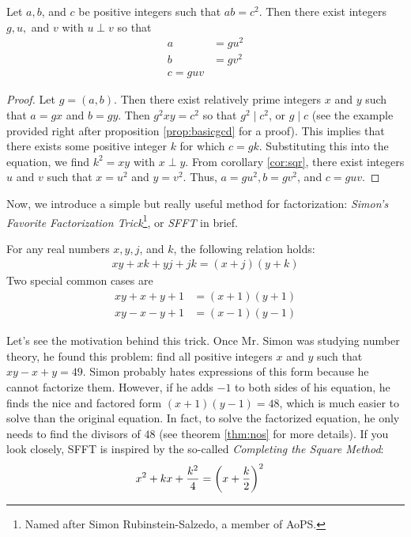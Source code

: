\begin{theorem}
	Let $a,b$, and $c$ be positive integers such that $ab=c^2$. Then there exist integers $g,u,$ and $v$ with $u\perp v$ so that
	\begin{align*}
		a
			& = gu^2\\
		b
			& = gv^2\\
		c = guv
	\end{align*}
\end{theorem}

\begin{proof}
	Let $g=(a,b)$. Then there exist relatively prime integers $x$ and $y$ such that $a=gx$ and $b=gy$. Then $g^2xy=c^2$ so that $g^2\mid c^2$, or $g\mid c$ (see the example provided right after proposition \eqref{prop:basicgcd} for a proof). This implies that there exists some positive integer $k$ for which $c=gk$. Substituting this into the equation, we find $k^2=xy$ with $x\perp y$. From corollary \eqref{cor:sqr}, there exist integers $u$ and $v$ such that $x=u^2$ and $y=v^2$. Thus, $a=gu^2,b=gv^2$, and $c=guv$.
\end{proof}
Now, we introduce a simple but really useful method for factorization: \textit{Simon's Favorite Factorization Trick}\footnote{Named after Simon Rubinstein-Salzedo, a member of AoPS.}, or \textit{SFFT} in brief.
\begin{proposition}[SFFT]
	For any real numbers $x,y, j$, and $k$, the following relation holds:
	\begin{align*}
		xy+xk+yj+jk=(x+j)(y+k)
	\end{align*}
	Two special common cases are
		\begin{align*}
			xy + x + y + 1
				& = (x+1)(y+1)\\
			xy - x - y +1
				& = (x-1)(y-1)
		\end{align*}
\end{proposition}
Let's see the motivation behind this trick. Once Mr. Simon was studying number theory, he found this problem: find all positive integers $x$ and $y$ such that $xy-x+y=49$. Simon probably hates expressions of this form because he cannot factorize them. However, if he adds $-1$ to both sides of his equation, he finds the nice and factored form $(x+1)(y-1)=48$, which is much easier to solve than the original equation. In fact, to solve the factorized equation, he only needs to find the divisors of $48$ (see theorem \autoref{thm:nos} for more details). If you look closely, SFFT is inspired by the so-called \textit{Completing the Square Method}:
\begin{align*}
	x^2+kx+\frac{k^2}{4}
		& =\left(x+\frac{k}{2}\right)^2
\end{align*}
